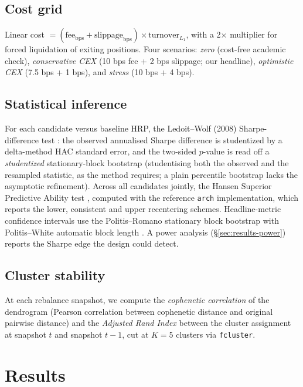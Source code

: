 \documentclass[11pt,a4paper]{article}
\begin{document}
\subsection{Cost grid}
Linear cost $= (\text{fee}_{\text{bps}} + \text{slippage}_{\text{bps}}) \times \text{turnover}_{L_1}$,
with a 2$\times$ multiplier for forced liquidation of exiting
positions. Four scenarios: \emph{zero} (cost-free academic check),
\emph{conservative CEX} (10 bps fee + 2 bps slippage; our headline),
\emph{optimistic CEX} (7.5 bps + 1 bps), and \emph{stress}
(10 bps + 4 bps).

\subsection{Statistical inference}
For each candidate versus baseline HRP, the Ledoit--Wolf (2008)
Sharpe-difference test \citep{ledoitwolf2008sharpe}: the observed
annualised Sharpe difference is studentized by a delta-method
HAC standard error, and the two-sided $p$-value is read off a
\emph{studentized} stationary-block bootstrap (studentising both the
observed and the resampled statistic, as the method requires; a
plain percentile bootstrap lacks the asymptotic refinement). Across all
candidates jointly, the Hansen Superior Predictive Ability test
\citep{hansen2005spa}, computed with the reference \texttt{arch}
implementation, which reports the lower, consistent and upper
recentering schemes. Headline-metric confidence intervals use the
Politis--Romano stationary block bootstrap \citep{politis1994bootstrap}
with Politis--White automatic block length \citep{politis2004blocklength}.
A power analysis (\S\ref{sec:results-power}) reports the Sharpe edge the
design could detect.

\subsection{Cluster stability}
At each rebalance snapshot, we compute the \emph{cophenetic correlation}
of the dendrogram (Pearson correlation between cophenetic distance
and original pairwise distance) and the \emph{Adjusted Rand Index}
\citep{hubert1985ari} between the cluster assignment at snapshot $t$
and snapshot $t-1$, cut at $K=5$ clusters via \texttt{fcluster}.

\section{Results}
\label{sec:results}
\end{document}
